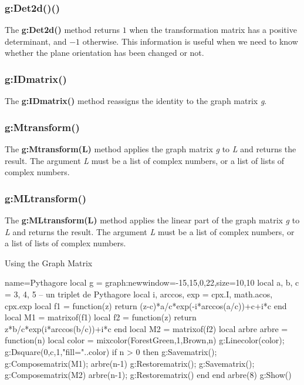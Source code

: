 \subsubsection{g:Det2d()()}
The \textbf{g:Det2d()} method returns $1$ when the transformation matrix has a positive determinant, and $-1$ otherwise. This information is useful when we need to know whether the plane orientation has been changed or not.

\subsubsection{g:IDmatrix()}
The \textbf{g:IDmatrix()} method reassigns the identity to the graph matrix \emph g.

\subsubsection{g:Mtransform()}
The \textbf{g:Mtransform(L)} method applies the graph matrix \emph g to \emph{L} and returns the result. The argument \emph L must be a list of complex numbers, or a list of lists of complex numbers.

\subsubsection{g:MLtransform()}
The \textbf{g:MLtransform(L)} method applies the linear part of the graph matrix \emph g to \emph{L} and returns the result. The argument \emph L must be a list of complex numbers, or a list of lists of complex numbers.

\begin{demo}{Using the Graph Matrix}
\begin{luadraw}{name=Pythagore}
local g = graph:new{window={-15,15,0,22},size={10,10}}
local a, b, c = 3, 4, 5 -- un triplet de Pythagore
local i, arccos, exp = cpx.I, math.acos, cpx.exp
local f1 = function(z)
        return (z-c)*a/c*exp(-i*arccos(a/c))+c+i*c end
local M1 = matrixof(f1)
local f2 = function(z)
        return z*b/c*exp(i*arccos(b/c))+i*c end
local M2 = matrixof(f2)
local arbre
arbre = function(n)
    local color = mixcolor(ForestGreen,1,Brown,n)
    g:Linecolor(color); g:Dsquare(0,c,1,"fill="..color)
    if n > 0 then
        g:Savematrix(); g:Composematrix(M1); arbre(n-1)
        g:Restorematrix(); g:Savematrix(); g:Composematrix(M2)
        arbre(n-1); g:Restorematrix()
    end
end
arbre(8)
g:Show()
\end{luadraw}
\end{demo}


